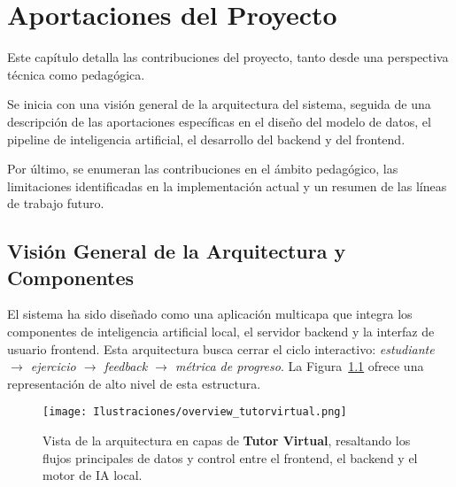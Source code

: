 \chapter{Aportaciones del Proyecto}
\label{chap:aportaciones}
\justifying

Este capítulo detalla las contribuciones del proyecto, tanto desde una perspectiva técnica como pedagógica. 

Se inicia con una visión general de la arquitectura del sistema, seguida de una descripción de las aportaciones específicas en el diseño del modelo de datos, el pipeline de inteligencia artificial, el desarrollo del backend y del frontend. 

Por último, se enumeran las contribuciones en el ámbito pedagógico, las limitaciones identificadas en la implementación actual y un resumen de las líneas de trabajo futuro.

\section{Visión General de la Arquitectura y Componentes}
\label{sec:vision_general_aportaciones}

\noindent
El sistema ha sido diseñado como una aplicación multicapa que integra los componentes de inteligencia artificial local, el servidor backend y la interfaz de usuario frontend. Esta arquitectura busca cerrar el ciclo interactivo: \emph{estudiante \(\rightarrow\) ejercicio \(\rightarrow\) feedback \(\rightarrow\) métrica de progreso}. La Figura~\ref{fig:overview-tutorvirtual} ofrece una representación de alto nivel de esta estructura.

\begin{figure}[H]
  \centering
  \texttt{[image: Ilustraciones/overview\_tutorvirtual.png]}
  \caption[Arquitectura en capas de Tutor Virtual]{Vista de la arquitectura en capas de \textbf{Tutor Virtual}, resaltando los flujos principales de datos y control entre el frontend, el backend y el motor de IA local.}
  \label{fig:overview-tutorvirtual}
\end{figure}

